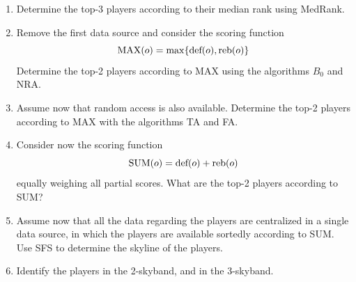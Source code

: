 \documentclass[12pt, a4paper]{report}
\newtheorem[style=M,bodystyle=\normalfont]{theorem}{Theorem}
\newtheorem[style=M,bodystyle=\normalfont]{corollary}{Corollary}
\newtheorem[style=M,bodystyle=\normalfont]{lemma}{Lemma}
\newtheorem[style=M,bodystyle=\normalfont]{definition}{Definition}
\begin{document}
        \begin{enumerate}
            \item Determine the top-3 players according to their median rank using MedRank.
            \item Remove the first data source and consider the scoring function
                \[\textnormal{MAX}(o) = \max\{\textnormal{def}(o), \textnormal{reb}(o)\}\] 
                Determine the top-2 players according to MAX using the algorithms $B_0$ and NRA.
            \item Assume now that random access is also available. Determine the top-2 players according to MAX with the algorithms TA and FA.
            \item Consider now the scoring function 
                \[\textnormal{SUM}(o) = \textnormal{def}(o) + \textnormal{reb}(o)\] 
                equally weighing all partial scores. What are the top-2 players according to SUM?
            \item Assume now that all the data regarding the players are centralized in a single data source, in which the players are available sortedly according to SUM. 
                Use SFS to determine the skyline of the players.
            \item Identify the players in the 2-skyband, and in the 3-skyband.
        \end{enumerate}
\end{document}
